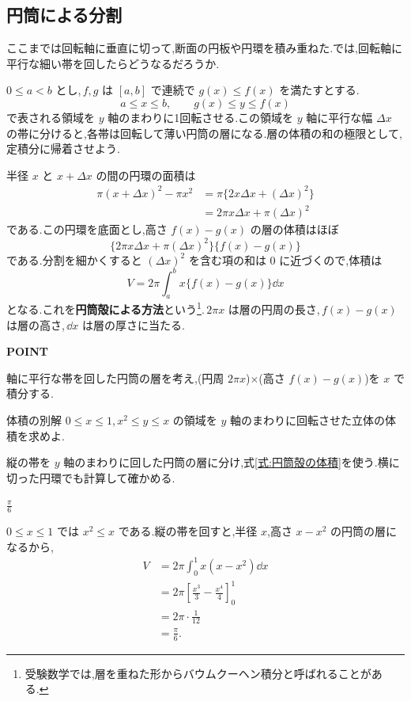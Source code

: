 \subsection{円筒による分割}

ここまでは回転軸に垂直に切って,断面の円板や円環を積み重ねた.では,回転軸に平行な細い帯を回したらどうなるだろうか.

$0\le a<b$ とし,\,$f,g$ は $[a,b]$ で連続で $g(x)\le f(x)$ を満たすとする.
\[
a\le x\le b,\qquad g(x)\le y\le f(x)
\]
で表される領域を $y$ 軸のまわりに1回転させる.この領域を $y$ 軸に平行な幅 $\Delta x$ の帯に分けると,各帯は回転して薄い円筒の層になる.層の体積の和の極限として,定積分に帰着させよう.

半径 $x$ と $x+\Delta x$ の間の円環の面積は
\begin{align*}
\pi(x+\Delta x)^2-\pi x^2
 &=\pi\{2x\Delta x+(\Delta x)^2\}\\
 &=2\pi x\Delta x+\pi(\Delta x)^2
\end{align*}
である.この円環を底面とし,高さ $f(x)-g(x)$ の層の体積はほぼ
\[
\{2\pi x\Delta x+\pi(\Delta x)^2\}\{f(x)-g(x)\}
\]
である.分割を細かくすると $(\Delta x)^2$ を含む項の和は $0$ に近づくので,体積は
\begin{equation}\label{式:円筒殻の体積}
V=2\pi\int_a^b x\{f(x)-g(x)\}\dd x
\end{equation}
となる.これを\textbf{円筒殻による方法}という\footnote{受験数学では,層を重ねた形からバウムクーヘン積分と呼ばれることがある.}.\,$2\pi x$ は層の円周の長さ,\,$f(x)-g(x)$ は層の高さ,\,$\dd x$ は層の厚さに当たる.

\begin{bookpoint}
\textbf{POINT}\par
軸に平行な帯を回した円筒の層を考え,(円周 $2\pi x$)$\times$(高さ $f(x)-g(x)$)を $x$ で積分する.
\end{bookpoint}

\begin{example}{体積の別解}
$0\le x\le1$,\,$x^2\le y\le x$ の領域を $y$ 軸のまわりに回転させた立体の体積を求めよ.
\end{example}

縦の帯を $y$ 軸のまわりに回した円筒の層に分け,式\eqref{式:円筒殻の体積}を使う.横に切った円環でも計算して確かめる.

$\frac{\pi}{6}$

$0\le x\le1$ では $x^2\le x$ である.縦の帯を回すと,半径 $x$,高さ $x-x^2$ の円筒の層になるから,
\begin{align*}
V&=2\pi\int_0^1x(x-x^2)\dd x\\
 &=2\pi\left[\frac{x^3}{3}-\frac{x^4}{4}\right]_0^1\\
 &=2\pi\cdot\frac1{12}\\
 &=\frac{\pi}{6}.
\end{align*}

